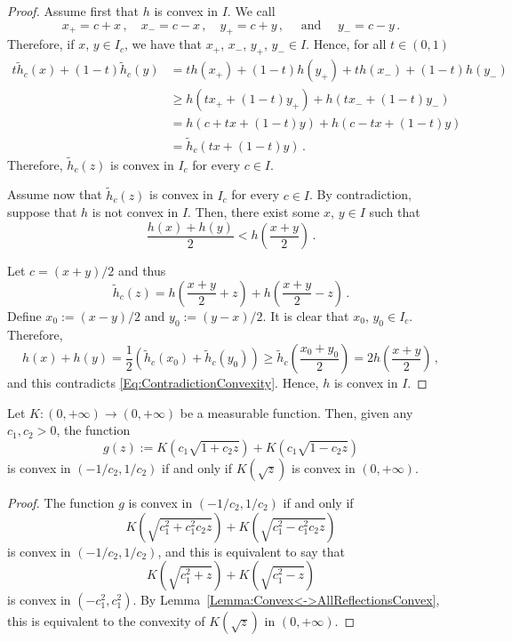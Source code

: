 \begin{proof}
Assume first that $h$ is convex in $I$. We call 
$$
x_+ = c + x\,, \quad x_- = c - x\,, \quad y_+ = c + y\,, \quad \textrm{ and } \quad y_- = c - y\,.
$$
Therefore, if $x$, $y\in I_c$, we have that $x_+$, $x_-$, $y_+$, $y_- \in I$. Hence, for all $t\in (0,1)$
\begin{align*}
t\widetilde{h}_c(x) + (1-t)\widetilde{h}_c(y) 
&=  th(x_+) + (1-t)h(y_+) + t h(x_-) + (1-t)h(y_-) \\
&\geq h(tx_+ + (1-t)y_+) + h(tx_- + (1-t)y_-) \\
&= h(c + tx + (1-t)y) + h(c-tx + (1-t)y) \\
& = \widetilde{h}_c(tx + (1-t)y)\,.
\end{align*}
Therefore, $\widetilde{h}_c(z)$ is convex in $I_c$ for every $c\in I$.

Assume now that $\widetilde{h}_c(z)$ is convex in $I_c$ for every $c\in I$. By contradiction, suppose that $h$ is not convex in $I$. Then, there exist some $x$, $y\in I$ such that
\begin{equation}
\label{Eq:ContradictionConvexity}
\dfrac{h(x) + h(y)}{2} < h \left (\dfrac{x+y}{2}\right )\,.
\end{equation}

Let $c = (x+y)/2$ and thus
$$
\widetilde{h}_c(z) = h\left( \dfrac{x+y}{2} + z\right) +  h\left( \dfrac{x+y}{2} - z\right)\,.
$$
Define $ x_0 := (x-y)/2$ and $y_0:= (y-x)/2$. It is clear that $x_0$, $y_0\in I_c$. Therefore,
$$
h(x) + h(y) = \dfrac{1}{2} \left( \widetilde{h}_c(x_0) + \widetilde{h}_c(y_0)\right )
\geq \widetilde{h}_c \left( \dfrac{x_0 + y_0}{2}\right )
= 2 h \left (\dfrac{x+y}{2}\right )\,,
$$
and this contradicts \eqref{Eq:ContradictionConvexity}. Hence, $h$ is convex in $I$.
\end{proof}


\begin{corollary}
\label{Cor:gConvex<->K(sqrt)convex}
Let $K:(0,+\infty) \to (0,+\infty)$ be a measurable function. Then, given any $c_1,c_2>0$, the function
$$
g(z) := K \left (c_1 \sqrt{1 + c_2 z}\right) +  K \left (c_1 \sqrt{1 - c_2 z}\right)
$$
is  convex in $(-1/c_2, 1/c_2)$ if and only if $K(\sqrt{z})$ is convex in $(0, +\infty)$.
\end{corollary}
\begin{proof}
The function $g$ is  convex in $(-1/c_2, 1/c_2)$ if and only if 
$$
K \left (\sqrt{c_1^2 + c_1^2c_2 z}\right) +  K \left (\sqrt{c_1^2 - c_1^2c_2 z}\right)
$$
is  convex in $(-1/c_2, 1/c_2)$, and this is equivalent to say that
$$
K \left(\sqrt{c_1^2 + z}\right) +  K \left(\sqrt{c_1^2 - z}\right)
$$
is convex in $(-c_1^2, c_1^2)$. By Lemma~\ref{Lemma:Convex<->AllReflectionsConvex}, this is equivalent to the convexity of $K(\sqrt{z})$ in $(0, +\infty)$.
\end{proof}

